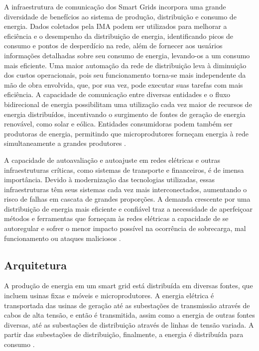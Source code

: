 \documentclass[cic,tc]{iiufrgs}
\begin{document}
A  infraestrutura de comunicação dos Smart Grids incorpora uma grande diversidade de benefícios ao sistema de produção, distribuição e consumo de energia. Dados coletados pela IMA podem ser utilizados para melhorar a eficiência e o desempenho da distribuição de energia, identificando picos de consumo e pontos de desperdício na rede, além de fornecer aos usuários informações detalhadas sobre seu consumo de energia, levando-os a um consumo mais eficiente. Uma maior automação da rede de distribuição leva à diminuição dos custos operacionais, pois seu funcionamento torna-se mais independente da mão de obra envolvida, que, por sua vez, pode executar suas tarefas com mais eficiência. A capacidade de comunicação entre diversas entidades e o fluxo bidirecional de energia possibilitam uma utilização cada vez maior de recursos de energia distribuídos, incentivando o surgimento de fontes de geração de energia renovável, como solar e eólica. Entidades consumidoras podem também ser produtoras de energia, permitindo que microprodutores forneçam energia à rede simultaneamente a grandes produtores \cite{2013survey}.

A capacidade de autoavaliação e autoajuste em redes elétricas e outras infraestruturas críticas, como sistemas de transporte e financeiros, é de imensa importância. Devido à modernização das tecnologias utilizadas, essas infraestruturas têm seus sistemas cada vez mais interconectados, aumentando o risco de falhas em cascata de grandes proporções. A demanda crescente por uma distribuição de energia mais eficiente e confiável traz a necessidade de aperfeiçoar métodos e ferramentas que forneçam às redes elétricas a capacidade de se autoregular e sofrer o menor impacto possível na ocorrência de sobrecarga, mal funcionamento ou ataques maliciosos \cite{massoud2005toward}.

\subsection{Arquitetura}
\label{subsecarq}

A produção de energia em um smart grid está distribuída em diversas fontes, que incluem usinas fixas e móveis e microprodutores. A energia elétrica é transportada das usinas de geração até as subestações de transmissão através de cabos de alta tensão, e então é transmitida, assim como a energia de outras fontes diversas, até as subestações de distribuição através de linhas de tensão variada. A partir das subestações de distribuição, finalmente, a energia é distribuída para consumo \cite{harb2013communication}.
\end{document}
